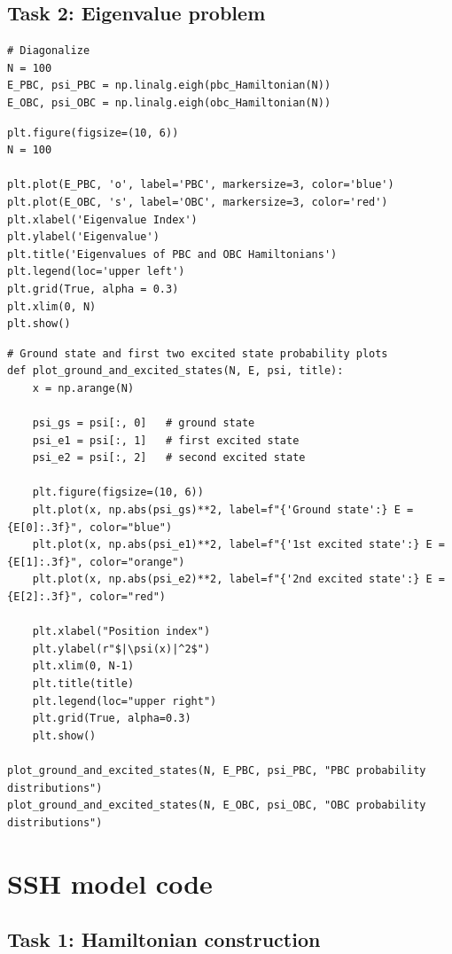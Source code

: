 \documentclass{report}
\begin{document}
\subsection*{Task 2: Eigenvalue problem}

\begin{lstlisting}
# Diagonalize
N = 100
E_PBC, psi_PBC = np.linalg.eigh(pbc_Hamiltonian(N))
E_OBC, psi_OBC = np.linalg.eigh(obc_Hamiltonian(N))
\end{lstlisting}

\begin{lstlisting}
plt.figure(figsize=(10, 6))
N = 100

plt.plot(E_PBC, 'o', label='PBC', markersize=3, color='blue')
plt.plot(E_OBC, 's', label='OBC', markersize=3, color='red')
plt.xlabel('Eigenvalue Index')
plt.ylabel('Eigenvalue')
plt.title('Eigenvalues of PBC and OBC Hamiltonians')
plt.legend(loc='upper left')
plt.grid(True, alpha = 0.3)
plt.xlim(0, N)
plt.show()
\end{lstlisting}

\begin{lstlisting}
# Ground state and first two excited state probability plots
def plot_ground_and_excited_states(N, E, psi, title):
    x = np.arange(N)

    psi_gs = psi[:, 0]   # ground state
    psi_e1 = psi[:, 1]   # first excited state
    psi_e2 = psi[:, 2]   # second excited state

    plt.figure(figsize=(10, 6))
    plt.plot(x, np.abs(psi_gs)**2, label=f"{'Ground state':} E = {E[0]:.3f}", color="blue")
    plt.plot(x, np.abs(psi_e1)**2, label=f"{'1st excited state':} E = {E[1]:.3f}", color="orange")
    plt.plot(x, np.abs(psi_e2)**2, label=f"{'2nd excited state':} E = {E[2]:.3f}", color="red")

    plt.xlabel("Position index")
    plt.ylabel(r"$|\psi(x)|^2$")
    plt.xlim(0, N-1)
    plt.title(title)
    plt.legend(loc="upper right")
    plt.grid(True, alpha=0.3)
    plt.show()

plot_ground_and_excited_states(N, E_PBC, psi_PBC, "PBC probability distributions")
plot_ground_and_excited_states(N, E_OBC, psi_OBC, "OBC probability distributions")
\end{lstlisting}

\section*{SSH model code}
\subsection*{Task 1: Hamiltonian construction}
\end{document}
